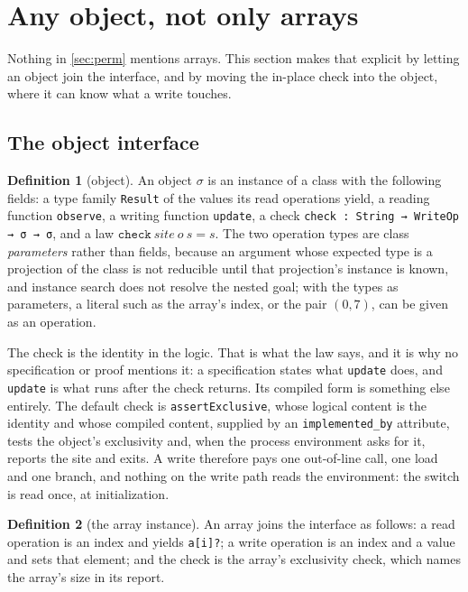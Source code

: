 \documentclass[11pt,a4paper]{article}
\theoremstyle{definition}
\newtheorem{definition}{Definition}[section]
\theoremstyle{plain}
\newcommand{\code}[1]{\texttt{#1}}
\begin{document}
\section{Any object, not only arrays}\label{sec:object}

Nothing in \cref{sec:perm} mentions arrays. This section makes that explicit by
letting an object join the interface, and by moving the in-place check into the
object, where it can know what a write touches.

\subsection{The object interface}

\begin{definition}[object]\label{def:fracobject}
An object $\sigma$ is an instance of a class with the following fields: a type
family \code{Result} of the values its read operations yield, a reading function
\code{observe}, a writing function \code{update}, a check
\code{check : String → WriteOp → σ → σ}, and a law
$\code{check}\ \mathit{site}\ o\ s = s$. The two operation types are class
\emph{parameters} rather than fields, because an argument whose expected type is
a projection of the class is not reducible until that projection's instance is
known, and instance search does not resolve the nested goal; with the types as
parameters, a literal such as the array's index, or the pair $(0,7)$, can be
given as an operation.
\end{definition}

The check is the identity in the logic. That is what the law says, and it is why
no specification or proof mentions it: a specification states what \code{update}
does, and \code{update} is what runs after the check returns. Its compiled form
is something else entirely. The default check is
\code{assertExclusive}, whose logical content is the identity and whose compiled
content, supplied by an \code{implemented\_by} attribute, tests the object's
exclusivity and, when the process environment asks for it, reports the site and
exits. A write therefore pays one out-of-line call, one load and one branch, and
nothing on the write path reads the environment: the switch is read once, at
initialization.

\begin{definition}[the array instance]\label{def:arrayinst}
An array joins the interface as follows: a read operation is an index and yields
\code{a[i]?}; a write operation is an index and a value and sets that element;
and the check is the array's exclusivity check, which names the array's size in
its report.
\end{definition}
\end{document}
